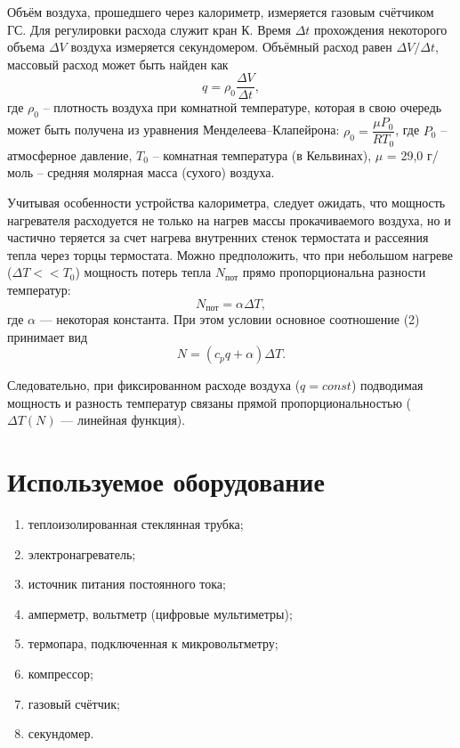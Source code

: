 \documentclass[a4paper, 12pt]{article}
\begin{document}
Объём воздуха, прошедшего через калориметр, измеряется газовым счётчиком ГС. Для регулировки расхода служит кран К. Время $\Delta t$ прохождения некоторого объема $\Delta V$ воздуха измеряется секундомером. Объёмный расход равен $\Delta V / \Delta t$, массовый расход может быть найден как
\begin{equation}\label{5}
q = \rho_0 \dfrac{\Delta V}{\Delta t},
\end{equation}
где $\rho_0$ -- плотность воздуха при комнатной температуре, которая в свою очередь может быть получена из уравнения Менделеева–Клапейрона: $\rho_0 = \dfrac{\mu P_0}{RT_0}$, где $P_0$ -- атмосферное давление, $T_0$ -- комнатная температура (в Кельвинах), $\mu$ = 29,0 г/моль -- средняя молярная масса (сухого) воздуха.

Учитывая особенности устройства калориметра, следует ожидать, что мощность нагревателя расходуется не только на нагрев массы прокачиваемого воздуха, но и частично теряется за счет нагрева внутренних стенок термостата и рассеяния тепла через торцы термостата. Можно предположить, что при небольшом нагреве ($\Delta T << T_0$) мощность потерь тепла $N_{\text{пот}}$ прямо пропорциональна разности температур:
\begin{equation}\label{5}
N_{\text{пот}} = \alpha \Delta T,
\end{equation}
где $\alpha$ — некоторая константа. При этом условии основное соотношение (2) принимает вид
\begin{equation}\label{6}
N = (c_p q+ \alpha) \Delta T.
\end{equation}

Следовательно, при фиксированном расходе воздуха ($q = const$) подводимая мощность и разность температур связаны прямой пропорциональностью ($\Delta T (N)$ — линейная функция).

\section{Используемое оборудование}

\begin{enumerate}
    \item теплоизолированная стеклянная трубка;
    \item электронагреватель;
    \item источник питания постоянного тока;
    \item амперметр, вольтметр (цифровые мультиметры);
    \item термопара, подключенная к микровольтметру;
    \item компрессор;
    \item газовый счётчик;
    \item секундомер.
\end{enumerate}
\end{document}
